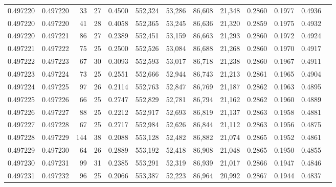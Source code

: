 \begin{tabular}{rrrrrrrrrrrrr}
0.497220 & 0.497220 &  33 &  27 &                                     0.4500 & 552,324 &  53,286 &  86,608 &  21,348 & 0.2860 & 0.1977 & 0.4936 \\
0.497220 & 0.497220 &  41 &  28 &                                     0.4058 & 552,365 &  53,245 &  86,636 &  21,320 & 0.2859 & 0.1975 & 0.4932 \\
0.497220 & 0.497221 &  86 &  27 &                                     0.2389 & 552,451 &  53,159 &  86,663 &  21,293 & 0.2860 & 0.1972 & 0.4924 \\
0.497221 & 0.497222 &  75 &  25 &                                     0.2500 & 552,526 &  53,084 &  86,688 &  21,268 & 0.2860 & 0.1970 & 0.4917 \\
0.497222 & 0.497223 &  67 &  30 &                                     0.3093 & 552,593 &  53,017 &  86,718 &  21,238 & 0.2860 & 0.1967 & 0.4911 \\
0.497223 & 0.497224 &  73 &  25 &                                     0.2551 & 552,666 &  52,944 &  86,743 &  21,213 & 0.2861 & 0.1965 & 0.4904 \\
0.497224 & 0.497225 &  97 &  26 &                                     0.2114 & 552,763 &  52,847 &  86,769 &  21,187 & 0.2862 & 0.1963 & 0.4895 \\
0.497225 & 0.497226 &  66 &  25 &                                     0.2747 & 552,829 &  52,781 &  86,794 &  21,162 & 0.2862 & 0.1960 & 0.4889 \\
0.497226 & 0.497227 &  88 &  25 &                                     0.2212 & 552,917 &  52,693 &  86,819 &  21,137 & 0.2863 & 0.1958 & 0.4881 \\
0.497227 & 0.497228 &  67 &  25 &                                     0.2717 & 552,984 &  52,626 &  86,844 &  21,112 & 0.2863 & 0.1956 & 0.4875 \\
0.497228 & 0.497229 & 144 &  38 &                                     0.2088 & 553,128 &  52,482 &  86,882 &  21,074 & 0.2865 & 0.1952 & 0.4861 \\
0.497229 & 0.497230 &  64 &  26 &                                     0.2889 & 553,192 &  52,418 &  86,908 &  21,048 & 0.2865 & 0.1950 & 0.4855 \\
0.497230 & 0.497231 &  99 &  31 &                                     0.2385 & 553,291 &  52,319 &  86,939 &  21,017 & 0.2866 & 0.1947 & 0.4846 \\
0.497231 & 0.497232 &  96 &  25 &                                     0.2066 & 553,387 &  52,223 &  86,964 &  20,992 & 0.2867 & 0.1944 & 0.4837 \\

\end{tabular}
